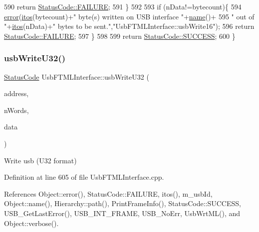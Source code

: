 \begin{DoxyCode}
590     \textcolor{keywordflow}{return} \hyperlink{classStatusCode_a6f565cbeadc76d14c72f047e5e85eb4ba3da73d4c469762eb9d3c960368252b26}{StatusCode::FAILURE};
591   \}
592 
593   \textcolor{keywordflow}{if} (nData!=bytecount)\{
594     \hyperlink{classObject_a204a95f57818c0f811933917a30eff45}{error}(\hyperlink{Tools_8h_af330027dbdafb9a30768b3613c553e60}{itos}(bytecount)+\textcolor{stringliteral}{" byte(s) written on USB interface "}+\hyperlink{classObject_a300f4c05dd468c7bb8b3c968868443c1}{name}()+
595             \textcolor{stringliteral}{" out of "}+\hyperlink{Tools_8h_af330027dbdafb9a30768b3613c553e60}{itos}(nData)+\textcolor{stringliteral}{" bytes to be sent."},\textcolor{stringliteral}{"UsbFTMLInterface::usbWrite16"});
596     \textcolor{keywordflow}{return} \hyperlink{classStatusCode_a6f565cbeadc76d14c72f047e5e85eb4ba3da73d4c469762eb9d3c960368252b26}{StatusCode::FAILURE};    
597   \}
598 
599   \textcolor{keywordflow}{return} \hyperlink{classStatusCode_a6f565cbeadc76d14c72f047e5e85eb4badd0da38d3ba0d922efd1f4619bc37ad8}{StatusCode::SUCCESS};  
600 \}
\end{DoxyCode}
\mbox{\label{classUsbFTMLInterface_a79433fc9a3dd8c96519960cd55958fbf}} 
\subsubsection{\texorpdfstring{usb\+Write\+U32()}{usbWriteU32()}}
{\footnotesize\ttfamily \hyperlink{classStatusCode}{Status\+Code} Usb\+F\+T\+M\+L\+Interface\+::usb\+Write\+U32 (\begin{DoxyParamCaption}\item[{unsigned long int}]{address,  }\item[{unsigned long int}]{n\+Words,  }\item[{unsigned long $\ast$}]{data }\end{DoxyParamCaption})}

Write usb (U32 format) 

Definition at line 605 of file Usb\+F\+T\+M\+L\+Interface.\+cpp.



References Object\+::error(), Status\+Code\+::\+F\+A\+I\+L\+U\+RE, itos(), m\+\_\+usb\+Id, Object\+::name(), Hierarchy\+::path(), Print\+Frame\+Info(), Status\+Code\+::\+S\+U\+C\+C\+E\+SS, U\+S\+B\+\_\+\+Get\+Last\+Error(), U\+S\+B\+\_\+\+I\+N\+T\+\_\+\+F\+R\+A\+ME, U\+S\+B\+\_\+\+No\+Err, Usb\+Wrt\+M\+L(), and Object\+::verbose().




